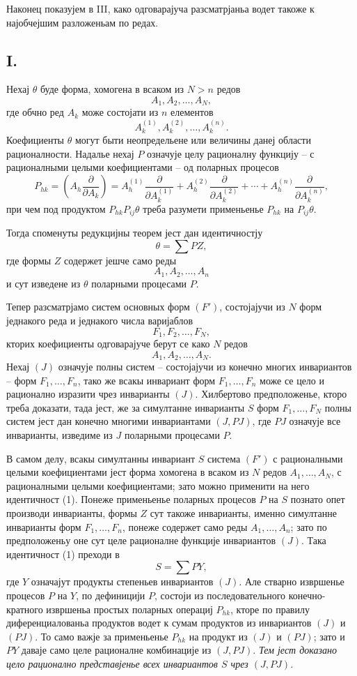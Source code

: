 \documentclass[11pt]{article}
\begin{document}
Наконец показујем в III, како одговарајуча разсматрјаньа водет такоже к најобчејшим разложеньам по редах.

\subsection*{I.}
Нехај $\theta$ буде форма, хомогена в всаком из $N>n$ редов
\[
  A_1,A_2,\ldots,A_N,
\]
где обчно ред $A_k$ може состојати из $n$ елементов
\[
  A_k^{(1)},A_k^{(2)},\ldots,A_k^{(n)}.
\]
Коефициенты $\theta$ могут быти неопредельене или величины данеј области рационалности. Надалье нехај $P$ означује целу рационалну функцију -- с рационалными целыми коефициентами -- од поларных процесов
\[
  P_{hk}=\left(A_h\frac{\partial}{\partial A_k}\right)
  =A_h^{(1)}\frac{\partial}{\partial A_k^{(1)}}+
   A_h^{(2)}\frac{\partial}{\partial A_k^{(2)}}+
   \cdots+
   A_h^{(n)}\frac{\partial}{\partial A_k^{(n)}},
\]
при чем под продуктом $P_{hk}P_{ij}\theta$ треба разумети применьенье $P_{hk}$ на $P_{ij}\theta$.

Тогда споменуты редукцијны теорем јест дан идентичностју
\begin{equation}
  \theta=\sum PZ,
\tag{1}
\end{equation}
где формы $Z$ содержет јешче само реды
\[
  A_1,A_2,\ldots,A_n
\]
и сут изведене из $\theta$ поларными процесами $P$.

Тепер разсматрјамо систем основных форм $(F')$, состојајучи из $N$ форм једнакого реда и једнакого числа варијаблов
\[
  F_1,F_2,\ldots,F_N,
\]
кторих коефициенты одговарајуче берут се како $N$ редов
\[
  A_1,A_2,\ldots,A_N.
\]
Нехај $(J)$ означује полны систем -- состојајучи из конечно многих инвариантов -- форм $F_1,\ldots,F_n$, тако же всакы инвариант форм $F_1,\ldots,F_n$ може се цело и рационално изразити чрез инварианты $(J)$. Хилбертово предположенье, кторо треба доказати, тада јест, же за симултанне инварианты $S$ форм $F_1,\ldots,F_N$ полны систем јест дан конечно многими инвариантами $(J,PJ)$, где $PJ$ означује все инварианты, изведиме из $J$ поларными процесами $P$.

В самом делу, всакы симултанны инвариант $S$ система $(F')$ с рационалными целыми коефициентами јест форма хомогена в всаком из $N$ редов $A_1,\ldots,A_N$, с рационалными целыми коефициентами; зато можно применити на него идентичност (1). Понеже применьенье поларных процесов $P$ на $S$ познато опет производи инварианты, формы $Z$ сут такоже инварианты, именно симултанне инварианты форм $F_1,\ldots,F_n$, понеже содержет само реды $A_1,\ldots,A_n$; зато по предположеньу оне сут целе рационалне функције инвариантов $(J)$. Така идентичност (1) преходи в
\[
  S=\sum PY,
\]
где $Y$ означајут продукты степеньев инвариантов $(J)$. Але стварно извршенье процесов $P$ на $Y$, по дефиницији $P$, состоји из последовательного конечно-кратного извршеньа простых поларных операциј $P_{hk}$, кторе по правилу диференциалованьа продуктов водет к сумам продуктов из инвариантов $(J)$ и $(PJ)$. То само важје за применьенье $P_{hk}$ на продукт из $(J)$ и $(PJ)$; зато и $PY$ даваје само целе рационалне комбинације из $(J,PJ)$. {\itshape Тем јест доказано цело рационално представјенье всех инвариантов $S$ чрез $(J,PJ)$.}
\end{document}
